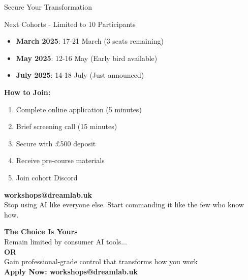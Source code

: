 \documentclass{beamer}
\begin{document}
\begin{frame}{Secure Your Transformation}
\begin{alertblock}{Next Cohorts - Limited to 10 Participants}
\begin{itemize}
\item \textbf{March 2025}: 17-21 March (3 seats remaining)
\item \textbf{May 2025}: 12-16 May (Early bird available)
\item \textbf{July 2025}: 14-18 July (Just announced)
\end{itemize}
\end{alertblock}
\vspace{0.5em}
\textbf{How to Join:}
\begin{enumerate}
\item Complete online application (5 minutes)
\item Brief screening call (15 minutes)
\item Secure with £500 deposit
\item Receive pre-course materials
\item Join cohort Discord
\end{enumerate}
\vspace{0.5em}
\begin{center}
\Large{\textcolor{aiblue}{\textbf{workshops@dreamlab.uk}}}\\
\small{Stop using AI like everyone else. Start commanding it like the few who know how.}
\end{center}
\end{frame}

\begin{frame}[plain]
\begin{center}
\Huge{\textbf{The Choice Is Yours}}\\
\vspace{1em}
\Large{Remain limited by consumer AI tools...}\\
\vspace{0.5em}
\Large{\textbf{OR}}\\
\vspace{0.5em}
\Large{\textcolor{aiblue}{Gain professional-grade control that transforms how you work}}\\
\vspace{2em}
\textbf{Apply Now: workshops@dreamlab.uk}
\end{center}
\end{frame}
\end{document}
